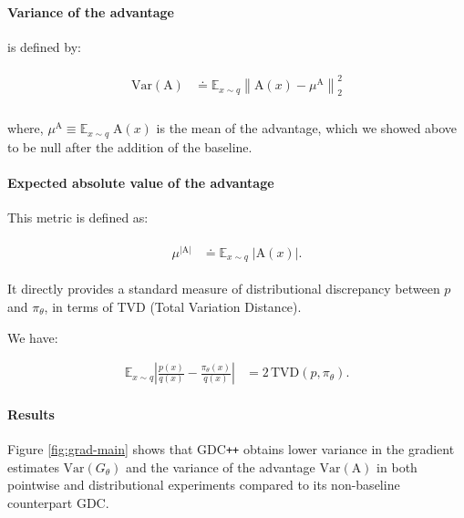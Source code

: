 \

\paragraph{Variance of the advantage} is defined by:

\begin{align}
\begin{split}
\mathrm{Var}\left(\mathrm{A}\right) &\doteq \mathbb{E}_{x \sim q} \left\|\mathrm{A}(x)-\mu^\mathrm{A} \right\|_{2}^{2} \\

\end{split}    
\end{align}

where, $\mu^\mathrm{A} \equiv \mathbb{E}_{x \sim q} \; \mathrm{A}(x)$ is the mean of the advantage, which we showed above to be null after the addition of the baseline. 

\paragraph{Expected absolute value of the advantage} This metric is defined as:

\begin{align}
\begin{split}
\mu^{|\mathrm{A}|} &\doteq \mathbb{E}_{x \sim q} \;  |\mathrm{A}(x)| .

\label{eq:absadv}
\end{split}
\end{align}

It directly provides a standard measure of distributional discrepancy between $p$ and ${\pi_\theta}$, in terms of TVD (Total Variation Distance).

We have:

\begin{equation}
\begin{split}
   \mathbb{E}_{x \sim q} \left| \frac{p(x)}{q(x)} - \frac{{\pi_\theta}(x)}{q(x)} \right|   &=
   2\,\mathrm{TVD}(p, {\pi_\theta}).
\end{split}
\end{equation}

\paragraph{Results} Figure \ref{fig:grad-main} shows that GDC\texttt{++}  obtains lower variance in the gradient estimates $\mathrm{Var}(G_\theta)$ and the variance of the advantage $\mathrm{Var}\left(\mathrm{A}\right)$ in both pointwise and distributional experiments compared to its non-baseline counterpart GDC.

